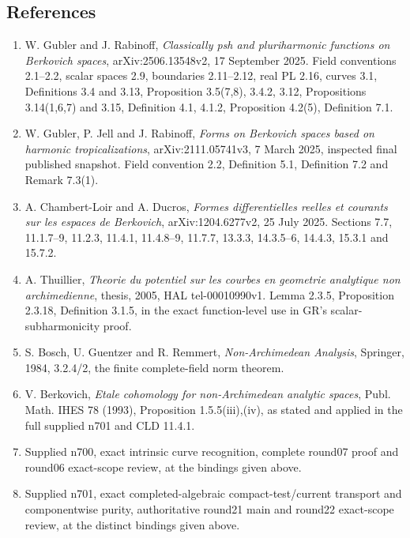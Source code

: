 \documentclass[
  11pt,
]{article}
\providecommand{\tightlist}{%
  \setlength{\itemsep}{0pt}\setlength{\parskip}{0pt}}
\begin{document}
\subsection{References}\label{references}

\begin{enumerate}
\def\labelenumi{\arabic{enumi}.}
\tightlist
\item
  W. Gubler and J. Rabinoff, \emph{Classically psh and pluriharmonic
  functions on Berkovich spaces}, arXiv:2506.13548v2, 17 September 2025.
  Field conventions 2.1--2.2, scalar spaces 2.9, boundaries 2.11--2.12,
  real PL 2.16, curves 3.1, Definitions 3.4 and 3.13, Proposition
  3.5(7,8), 3.4.2, 3.12, Propositions 3.14(1,6,7) and 3.15, Definition
  4.1, 4.1.2, Proposition 4.2(5), Definition 7.1.
\item
  W. Gubler, P. Jell and J. Rabinoff, \emph{Forms on Berkovich spaces
  based on harmonic tropicalizations}, arXiv:2111.05741v3, 7 March 2025,
  inspected final published snapshot. Field convention 2.2, Definition
  5.1, Definition 7.2 and Remark 7.3(1).
\item
  A. Chambert-Loir and A. Ducros, \emph{Formes differentielles reelles
  et courants sur les espaces de Berkovich}, arXiv:1204.6277v2, 25 July
  2025. Sections 7.7, 11.1.7--9, 11.2.3, 11.4.1, 11.4.8--9, 11.7.7,
  13.3.3, 14.3.5--6, 14.4.3, 15.3.1 and 15.7.2.
\item
  A. Thuillier, \emph{Theorie du potentiel sur les courbes en geometrie
  analytique non archimedienne}, thesis, 2005, HAL tel-00010990v1. Lemma
  2.3.5, Proposition 2.3.18, Definition 3.1.5, in the exact
  function-level use in GR's scalar-subharmonicity proof.
\item
  S. Bosch, U. Guentzer and R. Remmert, \emph{Non-Archimedean Analysis},
  Springer, 1984, 3.2.4/2, the finite complete-field norm theorem.
\item
  V. Berkovich, \emph{Etale cohomology for non-Archimedean analytic
  spaces}, Publ. Math. IHES 78 (1993), Proposition 1.5.5(iii),(iv), as
  stated and applied in the full supplied n701 and CLD 11.4.1.
\item
  Supplied n700, exact intrinsic curve recognition, complete round07
  proof and round06 exact-scope review, at the bindings given above.
\item
  Supplied n701, exact completed-algebraic compact-test/current
  transport and componentwise purity, authoritative round21 main and
  round22 exact-scope review, at the distinct bindings given above.
\end{enumerate}
\end{document}

